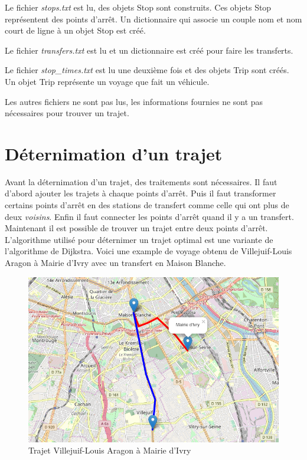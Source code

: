 \documentclass[a4paper, 12pt]{article}
\begin{document}
Le fichier \textit{stops.txt} est lu, des objets Stop sont construits. Ces
 objets Stop repr\'esentent des points d'arr\^et. Un dictionnaire qui associe
 un couple nom et nom court de ligne \`a un objet Stop est cr\'e\'e.

Le fichier \textit{transfers.txt} est lu et un dictionnaire est cr\'e\'e pour
 faire les transferts.

Le fichier \textit{stop\_times.txt} est lu une deuxi\`eme fois et des objets
 Trip sont cr\'e\'es. Un objet Trip repr\'esente un voyage que fait un
 v\'ehicule.

Les autres fichiers ne sont pas lus, les informations fournies ne sont pas
 n\'ecessaires pour trouver un trajet.

\section{D\'eternimation d'un trajet}
Avant la d\'eternimation d'un trajet, des traitements sont n\'ecessaires. Il
 faut d'abord ajouter les trajets \`a chaque points d'arr\^et. Puis il faut
 transformer certains points d'arr\^et en des stations de transfert comme celle
 qui ont plus de deux \textit{voisins}. Enfin il faut connecter les points
 d'arr\^et quand il y a un transfert. Maintenant il est possible de trouver un
 trajet entre deux points d'arr\^et. L'algorithme utilis\'e pour d\'eternimer
 un trajet optimal est une variante de l'algorithme de Dijkstra\cite{Dijkstra}.
 Voici une example de voyage obtenu de Villejuif-Louis Aragon \`a Mairie d'Ivry
 avec un transfert en Maison Blanche.

\begin{figure}[h!]
  \centering
  \includegraphics[width=\linewidth]{trajet.png}
  \caption{Trajet Villejuif-Louis Aragon \`a Mairie d'Ivry}
  \label{fig:trajet}
\end{figure}
\end{document}
